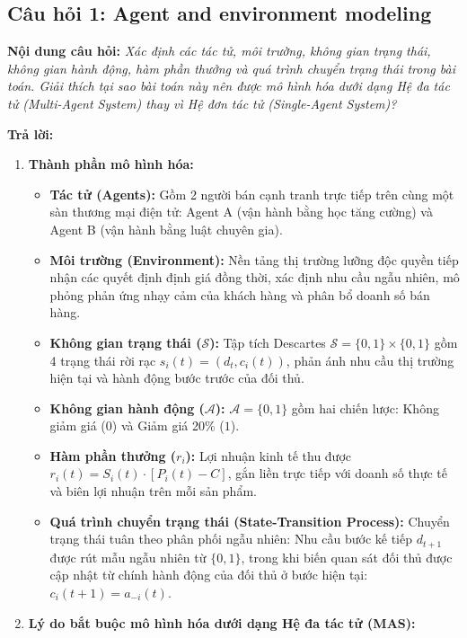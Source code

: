 \documentclass[12pt,a4paper]{article}
\begin{document}
\subsection{Câu hỏi 1: Agent and environment modeling}
\textbf{Nội dung câu hỏi:} \textit{Xác định các tác tử, môi trường, không gian trạng thái, không gian hành động, hàm phần thưởng và quá trình chuyển trạng thái trong bài toán. Giải thích tại sao bài toán này nên được mô hình hóa dưới dạng Hệ đa tác tử (Multi-Agent System) thay vì Hệ đơn tác tử (Single-Agent System)?}

\textbf{Trả lời:}
\begin{enumerate}
    \item \textbf{Thành phần mô hình hóa:}
    \begin{itemize}
        \item \textbf{Tác tử (Agents):} Gồm 2 người bán cạnh tranh trực tiếp trên cùng một sàn thương mại điện tử: Agent A (vận hành bằng học tăng cường) và Agent B (vận hành bằng luật chuyên gia).
        \item \textbf{Môi trường (Environment):} Nền tảng thị trường lưỡng độc quyền tiếp nhận các quyết định định giá đồng thời, xác định nhu cầu ngẫu nhiên, mô phỏng phản ứng nhạy cảm của khách hàng và phân bổ doanh số bán hàng.
        \item \textbf{Không gian trạng thái ($\mathcal{S}$):} Tập tích Descartes $\mathcal{S} = \{0, 1\} \times \{0, 1\}$ gồm 4 trạng thái rời rạc $s_i(t) = (d_t, c_i(t))$, phản ánh nhu cầu thị trường hiện tại và hành động bước trước của đối thủ.
        \item \textbf{Không gian hành động ($\mathcal{A}$):} $\mathcal{A} = \{0, 1\}$ gồm hai chiến lược: Không giảm giá ($0$) và Giảm giá 20\% ($1$).
        \item \textbf{Hàm phần thưởng ($r_i$):} Lợi nhuận kinh tế thu được $r_i(t) = S_i(t) \cdot [P_i(t) - C]$, gắn liền trực tiếp với doanh số thực tế và biên lợi nhuận trên mỗi sản phẩm.
        \item \textbf{Quá trình chuyển trạng thái (State-Transition Process):} Chuyển trạng thái tuân theo phân phối ngẫu nhiên: Nhu cầu bước kế tiếp $d_{t+1}$ được rút mẫu ngẫu nhiên từ $\{0, 1\}$, trong khi biến quan sát đối thủ được cập nhật từ chính hành động của đối thủ ở bước hiện tại: $c_i(t+1) = a_{-i}(t)$.
    \end{itemize}
    \item \textbf{Lý do bắt buộc mô hình hóa dưới dạng Hệ đa tác tử (MAS):}
    \begin{itemize}

\end{itemize}
\end{enumerate}
\end{document}
